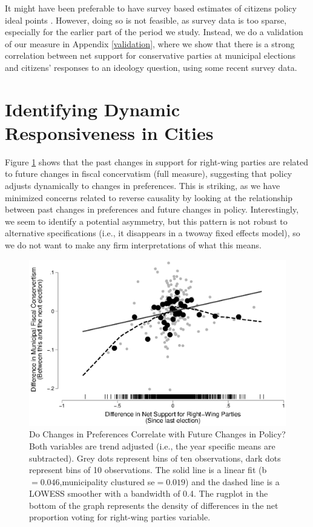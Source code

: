 \documentclass[a4paper,12pt]{article}
\begin{document}
 It might have been preferable to have survey based estimates of citizens policy ideal points \citep[similar to the measure used by][]{tausanovitch2014representation}. However, doing so is not feasible, as survey data is too sparse, especially for the earlier part of the period we study. Instead, we do a validation of our measure in Appendix \ref{validation}, where we show that there is a strong correlation between net support for conservative parties at municipal elections and citizens' responses to an ideology question, using some recent survey data.


\section*{Identifying Dynamic Responsiveness in Cities}
Figure \ref{fig:scatter} shows that the past changes in support for right-wing parties are related to future changes in fiscal concervatism (full measure), suggesting that  policy adjusts dynamically to changes in preferences. This is striking, as we have minimized concerns related to reverse causality by looking at the relationship between past changes in preferences and future changes in policy. Interestingly, we seem to identify a potential asymmetry, but this pattern is not robust to alternative specifications (i.e., it disappears in a twoway fixed effects model), so we do not want to make any firm interpretations of what this means.

\begin{figure}[h]
	\centering
	\includegraphics[scale = 0.8]{scatterplot.eps}
	\caption{Do Changes in Preferences Correlate with Future Changes in Policy? Both variables are trend adjusted (i.e., the year specific means are subtracted). Grey dots represent bins of ten observations, dark dots represent bins of 10 observations. The solid line is a linear fit (b$=0.046$,municipality clustured se$=0.019$) and the dashed line is a LOWESS smoother with a bandwidth of 0.4. The rugplot in the bottom of the graph represents the density of differences in the net proportion voting for right-wing parties variable. }
	\label{fig:scatter}
\end{figure}
\end{document}
